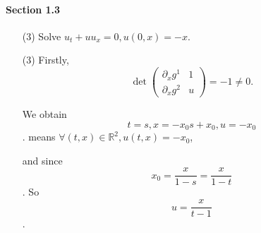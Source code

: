 \paragraph*{Section 1.3}
\begin{itemize}
    \item [(3)] Solve $u_t + uu_x = 0, u(0, x)= -x$.
\end{itemize}

\begin{solution}
    \begin{itemize}
        \item [(3)] Firstly,
        \[       
        \det \left( 
            \begin{array}{cc}
                \partial_x g^1 & 1 \\
                \partial_x g^2 & u
            \end{array} \right) = -1 \neq 0.
        \]

        We obtain \[t = s, x = -x_0 s + x_0, u = - x_0\].
        means $\forall (t, x) \in \mathbb{R}^2, u(t, x) = -x_0$,
        
        and since \[x_0 = \frac{x}{ 1 - s} = \frac{x}{1 - t}\].
        So
        \[ u = \frac{x}{t - 1}\].
    \end{itemize}
\end{solution}